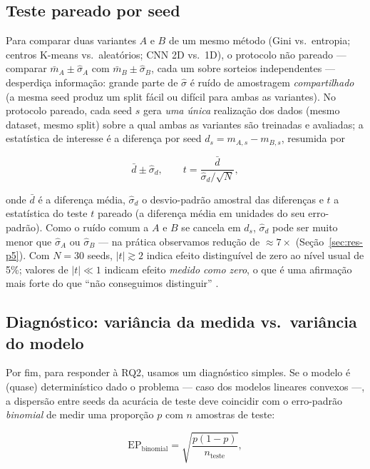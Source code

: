 \documentclass[12pt]{article}
\begin{document}
\subsection{Teste pareado por seed}\label{sec:met-pareado}

Para comparar duas variantes $A$ e $B$ de um mesmo método (Gini vs.\
entropia; centros K-means vs.\ aleatórios; CNN 2D vs.\ 1D), o protocolo não
pareado --- comparar $\bar{m}_A \pm \hat{\sigma}_A$ com $\bar{m}_B \pm
\hat{\sigma}_B$, cada um sobre sorteios independentes --- desperdiça
informação: grande parte de $\hat{\sigma}$ é ruído de amostragem
\emph{compartilhado} (a mesma seed produz um split fácil ou difícil para
ambas as variantes). No protocolo pareado, cada seed $s$ gera \emph{uma
única} realização dos dados (mesmo dataset, mesmo split) sobre a qual ambas
as variantes são treinadas e avaliadas; a estatística de interesse é a
diferença por seed $d_s = m_{A,s} - m_{B,s}$, resumida por

\begin{equation}
  \bar{d} \pm \hat{\sigma}_d, \qquad
  t = \frac{\bar{d}}{\hat{\sigma}_d / \sqrt{N}},
  \label{eq:paired}
\end{equation}

onde $\bar{d}$ é a diferença média, $\hat{\sigma}_d$ o desvio-padrão amostral
das diferenças e $t$ a estatística do teste $t$ pareado (a diferença média em
unidades do seu erro-padrão). Como o ruído comum a $A$ e $B$ se cancela em
$d_s$, $\hat{\sigma}_d$ pode ser muito menor que $\hat{\sigma}_A$ ou
$\hat{\sigma}_B$ --- na prática observamos redução de $\approx 7\times$
(Seção~\ref{sec:res-p5}). Com $N=30$ seeds, $|t| \gtrsim 2$ indica efeito
distinguível de zero ao nível usual de 5\%; valores de $|t| \ll 1$ indicam
efeito \emph{medido como zero}, o que é uma afirmação mais forte do que
``não conseguimos distinguir'' \cite{dietterich1998}.

\subsection{Diagnóstico: variância da medida vs.\ variância do modelo}
\label{sec:met-var}

Por fim, para responder à RQ2, usamos um diagnóstico simples. Se o modelo é
(quase) determinístico dado o problema --- caso dos modelos lineares
convexos ---, a dispersão entre seeds da acurácia de teste deve coincidir com
o erro-padrão \emph{binomial} de medir uma proporção $p$ com $n$ amostras de
teste:

\begin{equation}
  \mathrm{EP}_{\text{binomial}} = \sqrt{\frac{p(1-p)}{n_{\text{teste}}}},
  \label{eq:binomial}
\end{equation}
\end{document}
